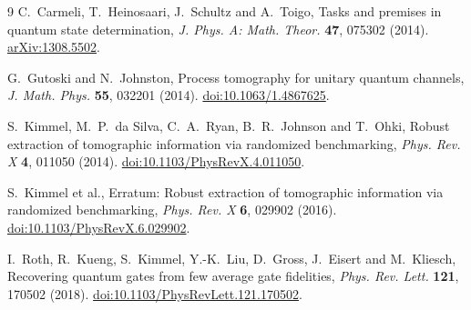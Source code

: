 \documentclass[11pt,a4paper]{article}
\begin{document}
\begingroup\small
\begin{thebibliography}{9}
C.~Carmeli, T.~Heinosaari, J.~Schultz and A.~Toigo,
Tasks and premises in quantum state determination,
\emph{J. Phys. A: Math. Theor.} \textbf{47}, 075302 (2014).
\href{https://arxiv.org/abs/1308.5502}{arXiv:1308.5502}.

G.~Gutoski and N.~Johnston,
Process tomography for unitary quantum channels,
\emph{J. Math. Phys.} \textbf{55}, 032201 (2014).
\href{https://doi.org/10.1063/1.4867625}{doi:10.1063/1.4867625}.

S.~Kimmel, M.~P.~da Silva, C.~A.~Ryan, B.~R.~Johnson and T.~Ohki,
Robust extraction of tomographic information via randomized benchmarking,
\emph{Phys. Rev. X} \textbf{4}, 011050 (2014).
\href{https://doi.org/10.1103/PhysRevX.4.011050}{doi:10.1103/PhysRevX.4.011050}.

S.~Kimmel et al.,
Erratum: Robust extraction of tomographic information via randomized
benchmarking, \emph{Phys. Rev. X} \textbf{6}, 029902 (2016).
\href{https://doi.org/10.1103/PhysRevX.6.029902}{doi:10.1103/PhysRevX.6.029902}.

I.~Roth, R.~Kueng, S.~Kimmel, Y.-K.~Liu, D.~Gross, J.~Eisert and M.~Kliesch,
Recovering quantum gates from few average gate fidelities,
\emph{Phys. Rev. Lett.} \textbf{121}, 170502 (2018).
\href{https://doi.org/10.1103/PhysRevLett.121.170502}{doi:10.1103/PhysRevLett.121.170502}.
\end{thebibliography}
\endgroup
\end{document}
